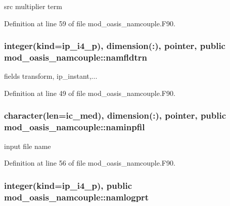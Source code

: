 src multiplier term 



Definition at line 59 of file mod\+\_\+oasis\+\_\+namcouple.\+F90.

\hypertarget{classmod__oasis__namcouple_a5f81bc00e6dc045770edd4093f68278c}{
\subsubsection[{namfldtrn}]{\setlength{\rightskip}{0pt plus 5cm}integer(kind=ip\+\_\+i4\+\_\+p), dimension(\+:), pointer, public mod\+\_\+oasis\+\_\+namcouple\+::namfldtrn}}\label{classmod__oasis__namcouple_a5f81bc00e6dc045770edd4093f68278c}


fields transform, ip\+\_\+instant,... 



Definition at line 49 of file mod\+\_\+oasis\+\_\+namcouple.\+F90.

\hypertarget{classmod__oasis__namcouple_a15fc11ff1c1d5718ff127a06a205a82c}{
\subsubsection[{naminpfil}]{\setlength{\rightskip}{0pt plus 5cm}character(len=ic\+\_\+med), dimension(\+:), pointer, public mod\+\_\+oasis\+\_\+namcouple\+::naminpfil}}\label{classmod__oasis__namcouple_a15fc11ff1c1d5718ff127a06a205a82c}


input file name 



Definition at line 56 of file mod\+\_\+oasis\+\_\+namcouple.\+F90.

\hypertarget{classmod__oasis__namcouple_a46affda5336f60a1eeb1badaaccd3cfd}{
\subsubsection[{namlogprt}]{\setlength{\rightskip}{0pt plus 5cm}integer(kind=ip\+\_\+i4\+\_\+p), public mod\+\_\+oasis\+\_\+namcouple\+::namlogprt}}\label{classmod__oasis__namcouple_a46affda5336f60a1eeb1badaaccd3cfd}


